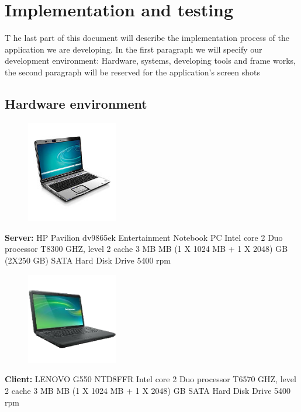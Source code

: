 \chapter{Implementation and testing}
\lettrine[lines=3]{T}{} he last part of this document will describe the implementation process of the application we are developing. In the first paragraph
we will specify our development environment: Hardware, systems, developing tools and frame works, the second paragraph will be reserved for the application's
screen shots
\section{Hardware environment}
\begin{figure}
\includegraphics[width=4cm]{./images/implementation/me}
\end{figure}
\textbf{Server:} 
HP Pavilion dv9865ek Entertainment Notebook PC\newline
Intel core 2 Duo processor T8300 GHZ, level 2 cache 3 MB MB (1 X 1024 MB + 1 X 2048) GB (2X250 GB) SATA Hard Disk Drive 5400 rpm\\
\newpage
\begin{figure}
\includegraphics[width=4cm]{./images/implementation/you}
\end{figure}

\textbf{Client:}
 LENOVO G550 NTD8FFR\newline
 Intel core 2 Duo processor T6570 GHZ, level 2 cache 3 MB MB (1 X 1024 MB + 1 X 2048) GB  SATA Hard Disk Drive 5400 rpm\newline
